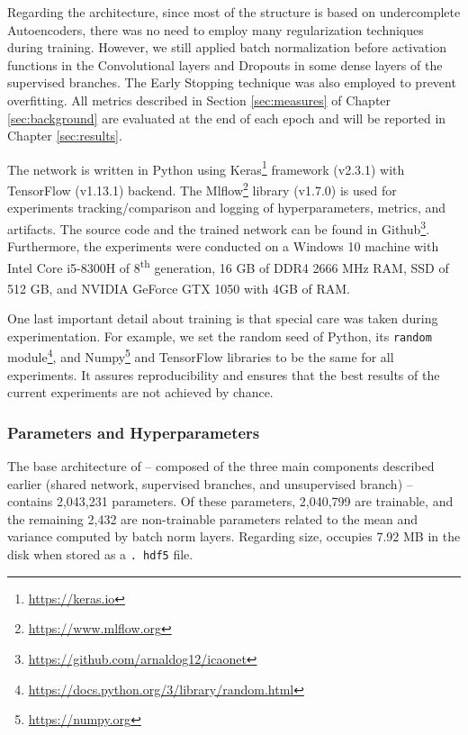 Regarding the architecture, since most of the \methodname structure is based on undercomplete Autoencoders, there was no need to employ many regularization techniques during training. However, we still applied batch normalization before activation functions in the Convolutional layers and Dropouts in some dense layers of the supervised branches. The Early Stopping technique was also employed to prevent overfitting. All metrics described in Section \ref{sec:measures} of Chapter \ref{sec:background} are evaluated at the end of each epoch and will be reported in Chapter \ref{sec:results}.
 
The network is written in Python using Keras\footnote{\url{https://keras.io}} framework (v2.3.1) with TensorFlow (v1.13.1) backend. The Mlflow\footnote{\url{https://www.mlflow.org}} library (v1.7.0) is used for experiments tracking/comparison and logging of hyperparameters, metrics, and artifacts. The source code and the trained network can be found in Github\footnote{\url{https://github.com/arnaldog12/icaonet}}. Furthermore, the experiments were conducted on a Windows 10 machine with Intel\textsuperscript{\tiny\textregistered} Core\textsuperscript{\tiny\texttrademark} i5-8300H of 8\textsuperscript{th} generation, 16 GB of DDR4 2666 MHz RAM, SSD of 512 GB, and NVIDIA\textsuperscript{\tiny\textregistered} GeForce\textsuperscript{\tiny\textregistered} GTX 1050 with 4GB of RAM.
 
One last important detail about \methodname training is that special care was taken during experimentation. For example, we set the random seed of Python, its \texttt{random} module\footnote{\url{https://docs.python.org/3/library/random.html}}, and Numpy\footnote{\url{https://numpy.org}} and TensorFlow libraries to be the same for all experiments. It assures reproducibility and ensures that the best results of the current experiments are not achieved by chance.
 
\subsubsection{Parameters and Hyperparameters} \label{sec:hyperparams}
 
The base architecture of \methodname -- composed of the three main components described earlier (shared network, supervised branches, and unsupervised branch) -- contains 2,043,231 parameters. Of these parameters, 2,040,799 are trainable, and the remaining 2,432 are non-trainable parameters related to the mean and variance computed by batch norm layers. Regarding size, \methodname occupies 7.92 MB in the disk when stored as a \texttt{. hdf5} file.
 
